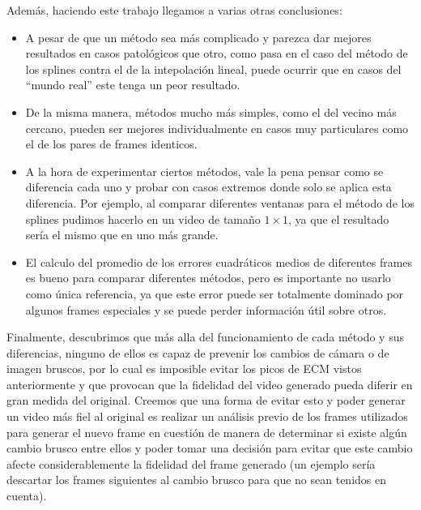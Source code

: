 \vspace{1em}

Adem\'as, haciendo este trabajo llegamos a varias otras conclusiones:

\vspace{-2ex}

\begin{itemize}
	\item A pesar de que un m\'etodo sea m\'as complicado y parezca dar mejores resultados en casos patol\'ogicos que otro, como pasa en el caso del m\'etodo de los splines contra el de la intepolaci\'on lineal, puede ocurrir que en casos del ``mundo real'' este tenga un peor resultado.
	\item De la misma manera, m\'etodos mucho m\'as simples, como el del vecino m\'as cercano, pueden ser mejores individualmente en casos muy particulares como el de los pares de frames identicos.
	\item A la hora de experimentar ciertos m\'etodos, vale la pena pensar como se diferencia cada uno y probar con casos extremos donde solo se aplica esta diferencia. Por ejemplo, al comparar diferentes ventanas para el m\'etodo de los splines pudimos hacerlo en un video de tama\~no \(1 \times 1\), ya que el resultado ser\'ia el mismo que en uno m\'as grande.
	\item El calculo del promedio de los errores cuadr\'aticos medios de diferentes frames es bueno para comparar diferentes m\'etodos, pero es importante no usarlo como \'unica referencia, ya que este error puede ser totalmente dominado por algunos frames especiales y se puede perder informaci\'on \'util sobre otros.
\end{itemize}

Finalmente, descubrimos que m\'as alla del funcionamiento de cada m\'etodo y sus diferencias, ninguno de ellos es capaz de prevenir los cambios de c\'amara o de imagen bruscos, por lo cual es imposible evitar los picos de ECM vistos anteriormente y que provocan que la fidelidad del video generado pueda diferir en gran medida del original. Creemos que una forma de evitar esto y poder generar un video m\'as fiel al original es realizar un an\'alisis previo de los frames utilizados para generar el nuevo frame en cuesti\'on de manera de determinar si existe alg\'un cambio brusco entre ellos y poder tomar una decisi\'on para evitar que este cambio afecte considerablemente la fidelidad del frame generado (un ejemplo ser\'ia descartar los frames siguientes al cambio brusco para que no sean tenidos en cuenta).